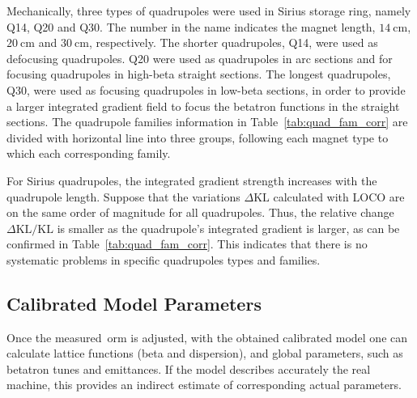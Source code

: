 Mechanically, three types of quadrupoles were used in Sirius storage ring, namely Q14, Q20 and Q30. The number in the name indicates the magnet length, $\SI{14}{\cm}$, $\SI{20}{\cm}$ and $\SI{30}{\cm}$, respectively. The shorter quadrupoles, Q14, were used as defocusing quadrupoles. Q20 were used as quadrupoles in arc sections and for focusing quadrupoles in high-beta straight sections. The longest quadrupoles, Q30, were used as focusing quadrupoles in low-beta sections, in order to provide a larger integrated gradient field to focus the betatron functions in the straight sections. The quadrupole families information in Table~\ref{tab:quad_fam_corr} are divided with horizontal line into three groups, following each magnet type to which each corresponding family. 

For Sirius quadrupoles, the integrated gradient strength increases with the quadrupole length. Suppose that the variations $\Delta \mathrm{KL}$ calculated with LOCO are on the same order of magnitude for all quadrupoles. Thus, the relative change $\Delta \mathrm{KL}/ \mathrm{KL}$ is smaller as the quadrupole's integrated gradient is larger, as can be confirmed in Table~\ref{tab:quad_fam_corr}. This indicates that there is no systematic problems in specific quadrupoles types and families. 

\subsection{Calibrated Model Parameters}
Once the measured~\gls{orm} is adjusted, with the obtained calibrated model one can calculate lattice functions (beta and dispersion), and global parameters, such as betatron tunes and emittances. If the model describes accurately the real machine, this provides an indirect estimate of corresponding actual parameters.

